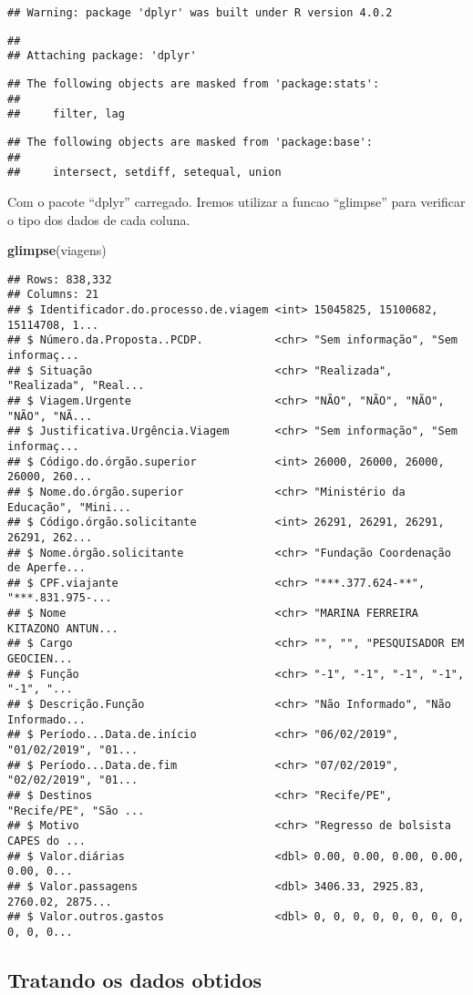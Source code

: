 \documentclass[
]{article}
\newenvironment{Shaded}{\begin{snugshade}}{\end{snugshade}}
\newcommand{\KeywordTok}[1]{\textcolor[rgb]{0.13,0.29,0.53}{\textbf{#1}}}
\newcommand{\NormalTok}[1]{#1}
\begin{document}
\begin{verbatim}
## Warning: package 'dplyr' was built under R version 4.0.2
\end{verbatim}

\begin{verbatim}
## 
## Attaching package: 'dplyr'
\end{verbatim}

\begin{verbatim}
## The following objects are masked from 'package:stats':
## 
##     filter, lag
\end{verbatim}

\begin{verbatim}
## The following objects are masked from 'package:base':
## 
##     intersect, setdiff, setequal, union
\end{verbatim}

Com o pacote ``dplyr'' carregado. Iremos utilizar a funcao ``glimpse''
para verificar o tipo dos dados de cada coluna.

\begin{Shaded}
\begin{Highlighting}[]
\KeywordTok{glimpse}\NormalTok{(viagens)}
\end{Highlighting}
\end{Shaded}

\begin{verbatim}
## Rows: 838,332
## Columns: 21
## $ Identificador.do.processo.de.viagem <int> 15045825, 15100682, 15114708, 1...
## $ Número.da.Proposta..PCDP.           <chr> "Sem informação", "Sem informaç...
## $ Situação                            <chr> "Realizada", "Realizada", "Real...
## $ Viagem.Urgente                      <chr> "NÃO", "NÃO", "NÃO", "NÃO", "NÃ...
## $ Justificativa.Urgência.Viagem       <chr> "Sem informação", "Sem informaç...
## $ Código.do.órgão.superior            <int> 26000, 26000, 26000, 26000, 260...
## $ Nome.do.órgão.superior              <chr> "Ministério da Educação", "Mini...
## $ Código.órgão.solicitante            <int> 26291, 26291, 26291, 26291, 262...
## $ Nome.órgão.solicitante              <chr> "Fundação Coordenação de Aperfe...
## $ CPF.viajante                        <chr> "***.377.624-**", "***.831.975-...
## $ Nome                                <chr> "MARINA FERREIRA KITAZONO ANTUN...
## $ Cargo                               <chr> "", "", "PESQUISADOR EM GEOCIEN...
## $ Função                              <chr> "-1", "-1", "-1", "-1", "-1", "...
## $ Descrição.Função                    <chr> "Não Informado", "Não Informado...
## $ Período...Data.de.início            <chr> "06/02/2019", "01/02/2019", "01...
## $ Período...Data.de.fim               <chr> "07/02/2019", "02/02/2019", "01...
## $ Destinos                            <chr> "Recife/PE", "Recife/PE", "São ...
## $ Motivo                              <chr> "Regresso de bolsista CAPES do ...
## $ Valor.diárias                       <dbl> 0.00, 0.00, 0.00, 0.00, 0.00, 0...
## $ Valor.passagens                     <dbl> 3406.33, 2925.83, 2760.02, 2875...
## $ Valor.outros.gastos                 <dbl> 0, 0, 0, 0, 0, 0, 0, 0, 0, 0, 0...
\end{verbatim}

\hypertarget{tratando-os-dados-obtidos}{%
\subsection{Tratando os dados obtidos}\label{tratando-os-dados-obtidos}}
\end{document}
